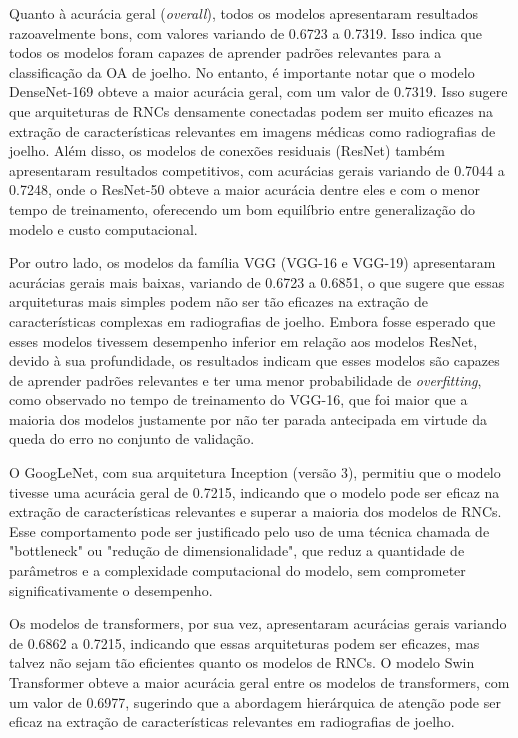 Quanto à acurácia geral (\textit{overall}), todos os modelos apresentaram resultados razoavelmente bons, com valores variando de 0.6723 a 0.7319. Isso indica que todos os modelos foram capazes de aprender padrões relevantes para a classificação da OA de joelho. No entanto, é importante notar que o modelo DenseNet-169 obteve a maior acurácia geral, com um valor de 0.7319. Isso sugere que arquiteturas de RNCs densamente conectadas podem ser muito eficazes na extração de características relevantes em imagens médicas como radiografias de joelho. Além disso, os modelos de conexões residuais (ResNet) também apresentaram resultados competitivos, com acurácias gerais variando de 0.7044 a 0.7248, onde o ResNet-50 obteve a maior acurácia dentre eles e com o menor tempo de treinamento, oferecendo um bom equilíbrio entre generalização do modelo e custo computacional.

Por outro lado, os modelos da família VGG (VGG-16 e VGG-19) apresentaram acurácias gerais mais baixas, variando de 0.6723 a 0.6851, o que sugere que essas arquiteturas mais simples podem não ser tão eficazes na extração de características complexas em radiografias de joelho. Embora fosse esperado que esses modelos tivessem desempenho inferior em relação aos modelos ResNet, devido à sua profundidade, os resultados indicam que esses modelos são capazes de aprender padrões relevantes e ter uma menor probabilidade de \textit{overfitting}, como observado no tempo de treinamento do VGG-16, que foi maior que a maioria dos modelos justamente por não ter parada antecipada em virtude da queda do erro no conjunto de validação.

O GoogLeNet, com sua arquitetura Inception (versão 3), permitiu que o modelo tivesse uma acurácia geral de 0.7215, indicando que o modelo pode ser eficaz na extração de características relevantes e superar a maioria dos modelos de RNCs. Esse comportamento pode ser justificado pelo uso de uma técnica chamada de "bottleneck" ou "redução de dimensionalidade", que reduz a quantidade de parâmetros e a complexidade computacional do modelo, sem comprometer significativamente o desempenho.

Os modelos de transformers, por sua vez, apresentaram acurácias gerais variando de 0.6862 a 0.7215, indicando que essas arquiteturas podem ser eficazes, mas talvez não sejam tão eficientes quanto os modelos de RNCs. O modelo Swin Transformer obteve a maior acurácia geral entre os modelos de transformers, com um valor de 0.6977, sugerindo que a abordagem hierárquica de atenção pode ser eficaz na extração de características relevantes em radiografias de joelho.

